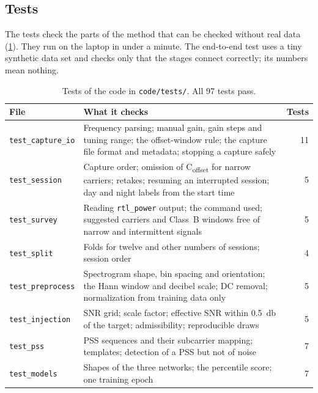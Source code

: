 \begin{singlespace}
\section{Tests}
\label{app:code-tests}

The tests check the parts of the method that can be checked without real data (\cref{tab:app-tests}). They run on the laptop in under a minute. The end-to-end test uses a tiny synthetic data set and checks only that the stages connect correctly; its numbers mean nothing.

\begin{table}[tbp]
  \centering
  \footnotesize
  \caption[Tests of the code]{Tests of the code in \texttt{code/tests/}. All 97 tests pass.}
  \label{tab:app-tests}
  \begin{tabularx}{\textwidth}{@{} >{\raggedright\arraybackslash}p{4.1cm} >{\raggedright\arraybackslash}X r @{}}
    \toprule
    File & What it checks & Tests \\
    \midrule
    \texttt{test\_capture\_io} & Frequency parsing; manual gain, gain steps and tuning range; the offset-window rule; the capture file format and metadata; stopping a capture safely & 11 \\
    \texttt{test\_session} & Capture order; omission of C\textsubscript{offset} for narrow carriers; retakes; resuming an interrupted session; day and night labels from the start time & 5 \\
    \texttt{test\_survey} & Reading \texttt{rtl\_power} output; the command used; suggested carriers and Class~B windows free of narrow and intermittent signals & 5 \\
    \texttt{test\_split} & Folds for twelve and other numbers of sessions; session order & 4 \\
    \texttt{test\_preprocess} & Spectrogram shape, bin spacing and orientation; the Hann window and decibel scale; DC removal; normalization from training data only & 5 \\
    \texttt{test\_injection} & SNR grid; scale factor; effective SNR within \qty{0.5}{\decibel} of the target; admissibility; reproducible draws & 5 \\
    \texttt{test\_pss} & PSS sequences and their subcarrier mapping; templates; detection of a PSS but not of noise & 7 \\
    \texttt{test\_models} & Shapes of the three networks; the percentile score; one training epoch & 7 \\

\end{tabularx}
\end{table}
\end{singlespace}
